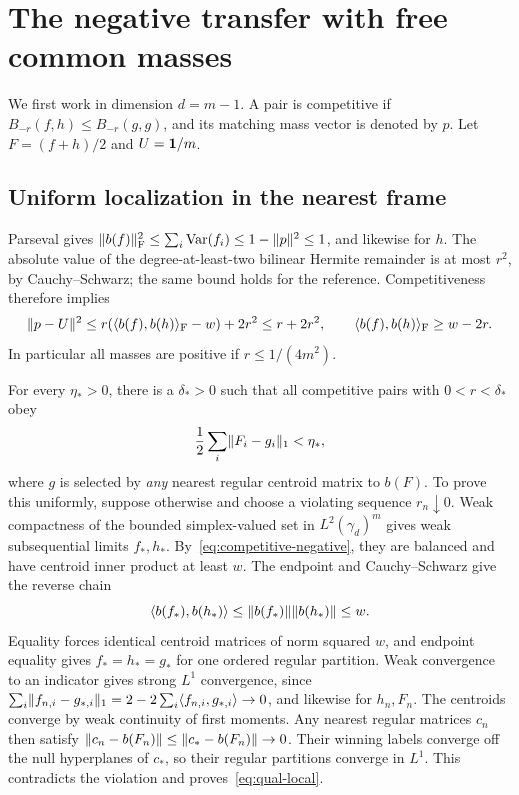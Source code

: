 \section{The negative transfer with free common masses}\label{app:negative}
We first work in dimension $d=m-1$. A pair is competitive if
$B_{-r}(f,h)\leq B_{-r}(g,g)$, and its matching mass vector is denoted by $p$.
Let $F=(f+h)/2$ and $U=\mathbf 1/m$.

\subsection{Uniform localization in the nearest frame}
Parseval gives
$\lVert b(f)\rVert_{\mathrm F}^2\leq\sum_i\operatorname{Var}(f_i)\leq1-\lVert p\rVert^2\leq1$,
and likewise for $h$.
The absolute value of the degree-at-least-two bilinear Hermite remainder
is at most $r^2$, by Cauchy--Schwarz; the same bound holds for the reference.
Competitiveness therefore implies
\begin{equation}\label{eq:competitive-negative}
 \lVert p-U\rVert^2\leq r(\langle b(f),b(h)\rangle_{\mathrm F}-w)+2r^2\leq r+2r^2,
 \qquad
 \langle b(f),b(h)\rangle_{\mathrm F}\geq w-2r.
\end{equation}
In particular all masses are positive if $r\leq1/(4m^2)$.

For every $\eta_*>0$, there is a $\delta_*>0$ such that all competitive
pairs with $0<r<\delta_*$ obey
\begin{equation}\label{eq:qual-local}
 \frac12\sum_i\lVert F_i-g_i\rVert_1<\eta_*,
\end{equation}
where $g$ is selected by \emph{any} nearest regular centroid matrix to $b(F)$.
To prove this uniformly, suppose otherwise and choose a violating sequence
$r_n\downarrow0$. Weak compactness of the bounded simplex-valued set in
$L^2(\gamma_d)^m$ gives weak subsequential limits $f_*,h_*$.
By~\eqref{eq:competitive-negative}, they are balanced and have centroid
inner product at least $w$. The endpoint and Cauchy--Schwarz give the reverse
chain
\[
 \langle b(f_*),b(h_*)\rangle\leq\lVert b(f_*)\rVert\lVert b(h_*)\rVert\leq w.
\]
Equality forces identical centroid matrices of norm squared $w$, and endpoint
equality gives $f_*=h_*=g_*$ for one ordered regular partition.
Weak convergence to an indicator gives strong $L^1$ convergence, since
$\sum_i\lVert f_{n,i}-g_{*,i}\rVert_1=2-2\sum_i\langle f_{n,i},g_{*,i}\rangle\to0$,
and likewise for $h_n,F_n$.
The centroids converge by weak continuity of first moments.
Any nearest regular matrices $c_n$ then satisfy
$\lVert c_n-b(F_n)\rVert\leq\lVert c_*-b(F_n)\rVert\to0$.
Their winning labels converge off the null hyperplanes of $c_*$, so their
regular partitions converge in $L^1$. This contradicts the violation and
proves~\eqref{eq:qual-local}.


